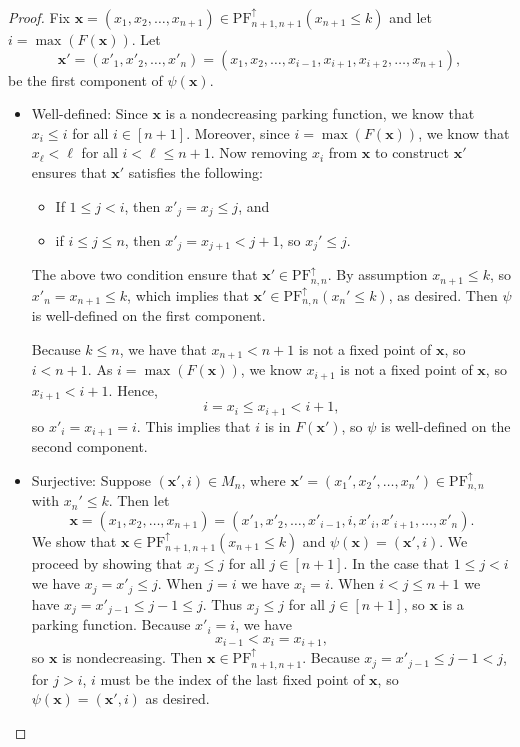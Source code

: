 \documentclass[10pt,a4paper]{amsart}
\newcommand{\NDPF}{\mathrm{PF}^{\uparrow}}
\newcommand{\x}{\mathbf{x}}
\begin{document}
\begin{proof} Fix $\x=(x_1,x_2,\ldots,x_{n+1}) \in \NDPF_{n+1,n+1}(x_{n+1} \leq k)$ and  let $i=\max(F(\x))$. Let \[\x'=(x'_1,x'_2,\dots,x'_n)=(x_1,x_2,\ldots,x_{i-1},x_{i+1},x_{i+2},\ldots,x_{n+1}),\] be the first component of $\psi(\x)$.


    \begin{itemize}[leftmargin=.2in]
        \item Well-defined: 
        Since $\x$ is a nondecreasing parking function, we know that $x_i\leq i$ for all $i\in[n+1]$.
        Moreover, since $i=\max(F(\x))$, we know that $x_\ell<\ell$ for all $i<\ell\leq n+1$. 
        Now removing $x_i$ from $\x$ to construct $\x'$ ensures that $\x'$
        satisfies the following: 
        \begin{itemize}
            \item If $1\leq j < i$, then $x'_j = x_j\leq j$, and 
            \item if $i\leq j\leq n$, then $x'_j = x_{j+1}< j+1$, so $x_j'\leq j$.
        \end{itemize}
        The above two condition ensure that $\x'\in\NDPF_{n,n}$. 
        By assumption $x_{n+1}\leq k$, so $x'_n=x_{n+1}\leq k$, which implies that $\x'\in\NDPF_{n,n}(x_n'\leq k)$, as desired. 
        Then $\psi$ is well-defined on the first component. 
        
        Because $k\leq n$, we have that $x_{n+1} < n+1$ is not a fixed point of $\x$, so $i < n+1$. As $i=\max(F(\x))$, we know $x_{i+1}$ is not a fixed point of $\x$, so $x_{i+1} < i+1$. Hence, \begin{equation}\label{eq:fp-stays}i = x_i \leq x_{i+1} < i+1,\end{equation}
        so $x'_i = x_{i+1} = i$. This implies that $i$ is in $F(\x')$, so $\psi$ is well-defined on the second component.
    
        \item Surjective: Suppose $(\x', i) \in M_n$, where $\x'=(x_1',x_2',\ldots,x_n')\in\NDPF_{n,n}$ with $x_n'\leq k$. Then let
        \[\x =(x_1,x_2,\ldots,x_{n+1})= (x'_1, x'_2, \ldots, x'_{i-1}, i, x'_{i}, x'_{i+1}, \ldots, x'_{n}).\]
        We show that $\x\in\NDPF_{n+1,n+1}(x_{n+1}\leq k)$ and $\psi(\x) = (\x', i)$. We proceed by showing that $x_j\leq j$ for all $j\in[n+1]$.
        In the case that $1\leq j < i$ we have $x_j = x'_j \leq j$. 
        When $j = i$ we have $x_i = i$.
        When $i<j\leq n+1$ we have $x_j = x'_{j-1} \leq j-1 \leq j$.
        Thus $x_j\leq j$ for all $j\in[n+1]$, so $\x$ is a parking function. Because $x'_i = i$, we have
        \[x_{i-1} < x_i = x_{i+1},\]
        so $\x$ is nondecreasing. Then $\x \in \NDPF_{n+1,n+1}$. Because $x_j = x'_{j-1} \leq j-1 < j$, for $j>i$, $i$ must be the index of the last fixed point of $\x$, so $\psi(\x) = (\x', i)$ as desired.


\end{itemize}
\end{proof}
\end{document}
